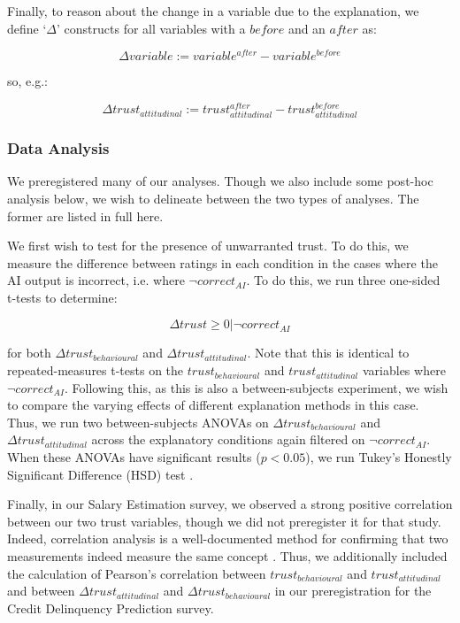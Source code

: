 Finally, to reason about the change in a variable due to the explanation, we define `$\Delta$' constructs for all variables with a $before$ and an $after$ as:

\begin{equation}
    \Delta variable := variable^{after} - variable^{before}
\end{equation}

\noindent so, e.g.:

\begin{equation}
    \Delta trust_{attitudinal} := trust_{attitudinal}^{after} - trust_{attitudinal}^{before}
\end{equation}

\subsubsection{Data Analysis}
We preregistered many of our analyses. Though we also include some post-hoc analysis below, we wish to delineate between the two types of analyses. The former are listed in full here.

We first wish to test for the presence of unwarranted trust. To do this, we measure the difference between ratings in each condition in the cases where the AI output is incorrect, i.e. where $\neg correct_{AI}$. To do this, we run three one-sided t-tests \cite{caldwell_power_nodate} to determine:

\begin{equation}
    \Delta trust \geq 0 | \neg correct_{AI}
\end{equation}

\noindent for both $\Delta trust_{behavioural}$ and $\Delta trust_{attitudinal}$. Note that this is identical to repeated-measures t-tests on the $trust_{behavioural}$ and $trust_{attitudinal}$ variables where $\neg correct_{AI}$. Following this, as this is also a between-subjects experiment, we wish to compare the varying effects of different explanation methods in this case. Thus, we run two between-subjects ANOVAs \cite{caldwell_power_nodate} on $\Delta trust_{behavioural}$ and $\Delta trust_{attitudinal}$ across the explanatory conditions again filtered on $\neg correct_{AI}$. When these ANOVAs have significant results ($p < 0.05$), we run Tukey's Honestly Significant Difference (HSD) test \cite{caldwell_power_nodate}.

Finally, in our Salary Estimation survey, we observed a strong positive correlation between our two trust variables, though we did not preregister it for that study. Indeed, correlation analysis is a well-documented method for confirming that two measurements indeed measure the same concept \cite{westen_quantifying_2003, morata-ramirez_construct_2013}. Thus, we additionally included the calculation of Pearson's correlation between $trust_{behavioural}$ and $trust_{attitudinal}$ and between $\Delta trust_{attitudinal}$ and $\Delta trust_{behavioural}$ in our preregistration for the Credit Delinquency Prediction survey. 

